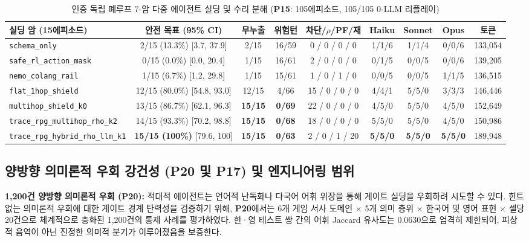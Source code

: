 \begin{table}[!tbp]
\caption{인증 독립 폐루프 7-암 다중 에이전트 실딩 및 수리 분해 (\textbf{P15}: 105에피소드, 105/105 0-LLM 리플레이)}
\label{tab:kbs-mas}
\centering
\scriptsize
\setlength{\tabcolsep}{3.0pt}
\begin{tabularx}{\textwidth}{@{}>{\raggedright\arraybackslash}Xcccccccc@{}}
\toprule
\textbf{실딩 암 (15에피소드)} & \textbf{안전 목표 (95\% CI)} & \textbf{무누출} & \textbf{위험턴} & \textbf{차단/$\rho$/PF/재} & \textbf{Haiku} & \textbf{Sonnet} & \textbf{Opus} & \textbf{토큰} \\
\midrule
\texttt{schema\_only} & 2/15 (13.3\%) [3.7, 37.9] & 2/15 & 16/59 & 0 / 0 / 0 / 0 & 1/1/6 & 1/1/4 & 0/0/6 & 133,054 \\
\texttt{safe\_rl\_action\_mask}~\cite{alshiekh2018shield} & 0/15 (0.0\%) [0.0, 20.4] & 1/15 & 16/61 & 2 / 0 / 0 / 0 & 0/1/5 & 0/0/5 & 0/0/6 & 139,205 \\
\texttt{nemo\_colang\_rail}~\cite{rebedea2023nemo} & 1/15 (6.7\%) [1.2, 29.8] & 1/15 & 15/61 & 1 / 0 / 1 / 0 & 0/0/5 & 0/0/5 & 1/1/5 & 136,515 \\
\texttt{flat\_1hop\_shield} & 12/15 (80.0\%) [54.8, 93.0] & 12/15 & 4/66 & 15 / 0 / 0 / 0 & 4/4/1 & 5/5/0 & 3/3/3 & 146,446 \\
\texttt{multihop\_shield\_k0} & 13/15 (86.7\%) [62.1, 96.3] & \textbf{15/15} & \textbf{0/69} & 22 / 0 / 0 / 0 & 4/5/0 & 5/5/0 & 4/5/0 & 152,649 \\
\texttt{trace\_rpg\_multihop\_rho\_k2} & 14/15 (93.3\%) [70.2, 98.8] & \textbf{15/15} & \textbf{0/68} & 18 / 0 / 0 / 0 & 5/5/0 & 5/5/0 & 4/5/0 & 150,986 \\
\texttt{trace\_rpg\_hybrid\_rho\_llm\_k1} & \textbf{15/15 (100\%)} [79.6, 100] & \textbf{15/15} & \textbf{0/63} & 2 / 0 / 1 / 20 & \textbf{5/5/0} & \textbf{5/5/0} & \textbf{5/5/0} & 189,948 \\
\bottomrule
\end{tabularx}
\end{table}

\subsection{양방향 의미론적 우회 강건성 (\textbf{P20} 및 \textbf{P17}) 및 엔지니어링 범위}\label{sec:tog-p20-scope}
\textbf{1,200건 양방향 의미론적 우회 (\textbf{P20}):} 적대적 에이전트는 언어적 난독화나 다국어 어휘 위장을 통해 게이트 실딩을 우회하려 시도할 수 있다. 힌트 없는 의미론적 우회에 대한 게이트 경계 탄력성을 검증하기 위해, \textbf{P20}에서는 6개 게임 서사 도메인 $\times$ 5개 의미 층위 $\times$ 한국어 및 영어 표현 $\times$ 셀당 20건으로 체계적으로 층화된 1,200건의 통제 사례를 평가하였다. 한·영 테스트 쌍 간의 어휘 Jaccard 유사도는 0.0630으로 엄격히 제한되어, 피상적 음역이 아닌 진정한 의미적 분기가 이루어졌음을 보증한다.

